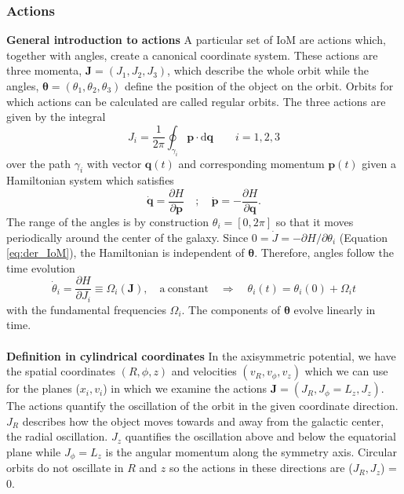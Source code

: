 \subsubsection{Actions}\label{subsubsec:actions_theo}
\textbf{General introduction to actions} A particular set of \ac{IoM} are actions which, together with angles, create a canonical coordinate system. These actions are three momenta, $\mathbf{J} = (J_1, J_2, J_3)$, which describe the whole orbit while the angles, $\bm{\theta} = (\theta_1, \theta_2, \theta_3) $ define the position of the object on the orbit. Orbits for which actions can be calculated are called regular orbits. The three actions are given by the integral
\begin{equation}
    J_i = \frac{1}{2\pi}\oint_{\gamma_i}\mathbf{p}\cdot\mathrm{d}\mathbf{q} \qquad i = 1,2,3
\end{equation}
over the path $\gamma_i$ with vector $\mathbf{q}(t)$ and corresponding momentum $\mathbf{p}(t)$ given a Hamiltonian system which satisfies 
\begin{equation}
    \dot{\mathbf{q}} = \frac{\partial H}{\partial \mathbf{p}} \quad;\quad \dot{\mathbf{p}} = - \frac{\partial H}{\partial \mathbf{q}}. 
\end{equation}
The range of the angles is by construction $\theta_i = [0,2\pi]$ so that it moves periodically around the center of the galaxy. Since $0 = \dot{J} = -\partial H / \partial\theta_i$ (Equation \ref{eq:der_IoM}), the Hamiltonian is independent of $\bm{\theta}$. Therefore, angles follow the time evolution
\begin{equation}
    \dot{\theta}_i = \frac{\partial H}{\partial J_i} \equiv \Omega_i(\mathbf{J}), \quad \mathrm{a\ constant} \quad \Rightarrow\quad \theta_i(t) = \theta_i(0) +  \Omega_i t
\end{equation}
with the fundamental frequencies $\Omega_i$. The components of $\bm{\theta}$ evolve linearly in time. 
\\\\\textbf{Definition in cylindrical coordinates} In the axisymmetric potential, we have the spatial coordinates $(R, \phi, z)$ and velocities $(v_R, v_\phi, v_z)$ which we can use for the planes ($x_i, v_i$) in which we examine the actions $\mathbf{J} = (J_R, J_\phi = L_z, J_z)$. The actions quantify the oscillation of the orbit in the given coordinate direction. $J_R$ describes how the object moves towards and away from the galactic center, the radial oscillation. $J_z$ quantifies the oscillation above and below the equatorial plane while $J_\phi = L_z$ is the angular momentum along the symmetry axis. Circular orbits do not oscillate in $R$ and $z$ so the actions in these directions are ($J_R, J_z$) = 0.


